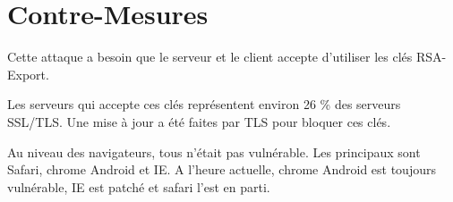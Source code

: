 \section{Contre-Mesures}
\label{sec:cmFreak}

Cette attaque a besoin que le serveur et le client accepte d'utiliser les clés RSA-Export.

Les serveurs qui accepte ces clés représentent environ 26 \% des serveurs SSL/TLS. Une mise à jour a été faites par
TLS pour bloquer ces clés.

Au niveau des navigateurs, tous n'était pas vulnérable. Les principaux sont Safari, chrome Android et IE. 
A l'heure actuelle, chrome Android est toujours vulnérable, IE est patché et safari l'est en parti.
